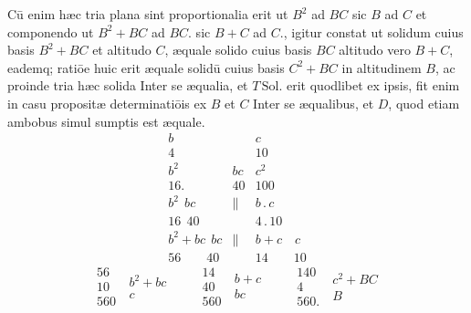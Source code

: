 \documentclass[11pt,a4paper]{article}
\begin{document}
Cū enim hæc tria plana sint proportionalia erit ut $B^{2}$ ad $BC$ sic $B$ ad $C$ et componendo ut $B^{2} + BC$ ad $BC$. sic $B + C$ ad $C$., igitur constat  ut solidum cuius basis $B^{2} + BC$ et altitudo $C$, æquale solido cuius basis $BC$ altitudo vero $B + C$, eademq; ratiōe huic erit æquale solidū cuius basis $C^{2} + BC$ in altitudinem $B$, ac proinde tria hæc solida Inter se æqualia, et $T\,\mathrm{Sol.}$ erit quodlibet ex ipsis, fit enim in casu propositæ determinatiōis ex $B$ et $C$ Inter se æqualibus, et $D$, quod etiam ambobus simul sumptis est æquale.
\[ \begin{array}{lll} b & & c \\ 4 & & 10 \\ \hline b^{2} & bc & c^{2} \\ 16. & 40 & 100 \\ \hline b^{2}\ \ bc & \parallel & b\,.\,c \\ 16\ \ 40 & & 4\,.\,10 \\ \hline b^{2}+bc\ \ bc & \parallel & b+c \quad c \\ 56 \qquad 40 & & 14 \qquad 10 \end{array} \]
\[ \begin{array}{r} 56 \\ 10 \\ \hline 560 \end{array}\ \begin{array}{l} b^{2}+bc \\ c \end{array} \qquad \begin{array}{r} 14 \\ 40 \\ \hline 560 \end{array}\ \begin{array}{l} b+c \\ bc \end{array} \qquad \begin{array}{r} 140 \\ 4 \\ \hline 560. \end{array}\ \begin{array}{l} c^{2}+BC \\ B \end{array} \]
\end{document}
